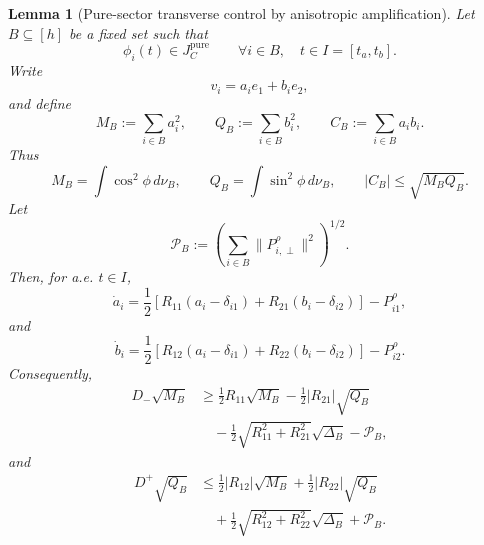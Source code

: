 \documentclass{article} %
\theoremstyle{plain}
\newtheorem{lemma}[theorem]{Lemma}
\theoremstyle{definition}
\theoremstyle{remark}
\begin{document}
\begin{lemma}[Pure-sector transverse control by anisotropic amplification]
\label{lem:pure-sector-anisotropic-amplification}
Let $B\subseteq[h]$ be a fixed set such that
\[
\phi_i(t)\in J_C^{\mathrm{pure}}
\qquad
\forall i\in B,
\quad t\in I=[t_a,t_b].
\]
Write
\[
v_i=a_ie_1+b_ie_2,
\]
and define
\[
\boxed{
M_B:=\sum_{i\in B}a_i^2,
\qquad
Q_B:=\sum_{i\in B}b_i^2,
\qquad
C_B:=\sum_{i\in B}a_ib_i.
}
\]
Thus
\[
M_B=\int\cos^2\phi\,d\nu_B,
\qquad
Q_B=\int\sin^2\phi\,d\nu_B,
\qquad
|C_B|\le\sqrt{M_BQ_B}.
\]
Let
\[
\mathcal P_B
:=
\left(
\sum_{i\in B}\|P_{i,\perp}^\rho\|^2
\right)^{1/2}.
\]
Then, for a.e. $t\in I$,
\[
\boxed{
\dot a_i
=
\frac12
\left[
R_{11}(a_i-\delta_{i1})
+
R_{21}(b_i-\delta_{i2})
\right]
-
P_{i1}^\rho,
}
\]
and
\[
\boxed{
\dot b_i
=
\frac12
\left[
R_{12}(a_i-\delta_{i1})
+
R_{22}(b_i-\delta_{i2})
\right]
-
P_{i2}^\rho.
}
\]
Consequently,
\[
\boxed{
\begin{aligned}
D_-\sqrt{M_B}
&\ge
\frac12R_{11}\sqrt{M_B}
-
\frac12|R_{21}|\sqrt{Q_B}
\\
&\quad
-
\frac12\sqrt{R_{11}^2+R_{21}^2}\sqrt{\Delta_B}
-
\mathcal P_B,
\end{aligned}
}
\tag{M-sqrt-lower}\label{eq:M-sqrt-lower}
\]
and
\[
\boxed{
\begin{aligned}
D^+\sqrt{Q_B}
&\le
\frac12|R_{12}|\sqrt{M_B}
+
\frac12|R_{22}|\sqrt{Q_B}
\\
&\quad
+
\frac12\sqrt{R_{12}^2+R_{22}^2}\sqrt{\Delta_B}
+
\mathcal P_B.
\end{aligned}
}
\tag{Q-sqrt-upper}\label{eq:Q-sqrt-upper}
\]


\end{lemma}
\end{document}
